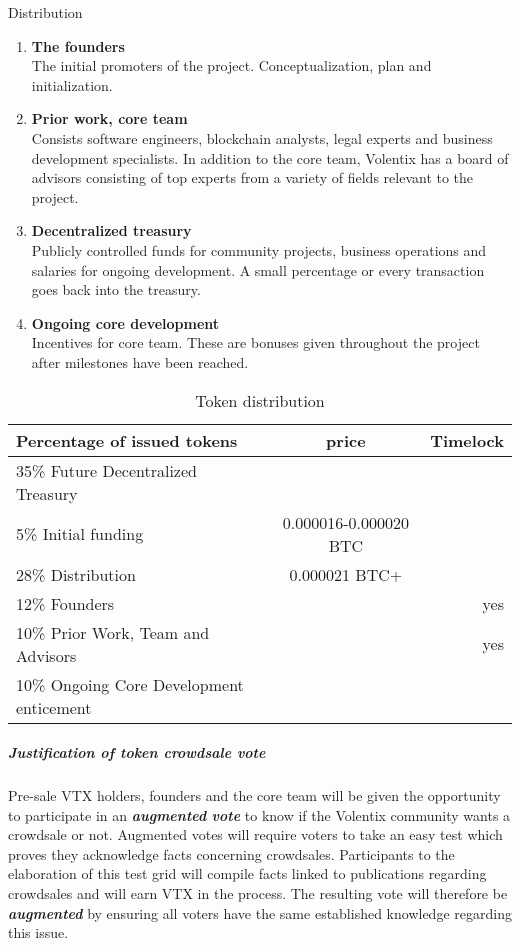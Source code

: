 \documentclass[]{article}
\begin{document}
Distribution
\begin{enumerate}
\item \textbf{The founders}\\
The initial promoters of the project. 
Conceptualization, plan and initialization.	
\item \textbf{Prior work,	 core team }\\
Consists software engineers, blockchain analysts, legal experts and business development specialists. 
In addition to the core team, Volentix has a board of advisors consisting of top experts from a variety of fields relevant to the project.
\item\textbf{ Decentralized treasury}\\
Publicly controlled funds for community projects, business operations and salaries for ongoing development. 
A small percentage or every transaction goes back into the treasury.
\item \textbf{Ongoing core development} \\
Incentives for core team. These are bonuses given throughout the project after milestones have been reached.
\end{enumerate}
	
\begin{table}[h!]
	\begin{center}
		\caption{Token distribution}
		\label{tab:table1}
		\begin{tabular}{l|c|r}
			\textbf{Percentage of issued tokens} & \textbf{price} & \textbf{Timelock} \\
		
			\hline
			35\% Future Decentralized Treasury & & \\
			\hline
			5\%  Initial funding & 0.000016-0.000020 BTC & \\
			\hline
			28\% Distribution & 0.000021 BTC+ & \\
			\hline
			12\% Founders &  & yes \\
			\hline
			10\% Prior Work, Team and Advisors & & yes\\
		
			\hline
			10\% Ongoing Core Development enticement & &\\
			\hline		
			
				
		\end{tabular}
	\end{center}


\end{table}

\subparagraph{Justification of token crowdsale vote}
Pre-sale VTX holders, founders and the core team will be given the opportunity to participate in an \textbf{\textit{augmented} \textit{vote}}\cite{21} 
to know if the Volentix community wants a crowdsale or not. 
Augmented votes will require voters to take an easy test which proves they acknowledge facts concerning crowdsales. 
Participants to the elaboration of this test grid will compile facts linked to publications regarding crowdsales and will earn VTX in the process. 
The resulting vote will therefore be \textit{\textbf{augmented}} by ensuring all voters have the same established knowledge regarding this issue.  
\end{document}
